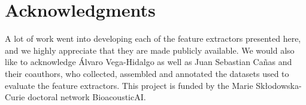 \documentclass[11pt]{article}
\begin{document}
%













\section{Acknowledgments}
A lot of work went into developing each of the feature extractors presented here, and we highly appreciate that they are made publicly available.
We would also like to acknowledge Álvaro Vega-Hidalgo as well as Juan Sebastian Cañas and their coauthors, who collected, assembled and annotated the datasets used to evaluate the feature extractors. 
This project is funded by the Marie Skłodowska-Curie doctoral network BioacousticAI.
% 

\end{document}

